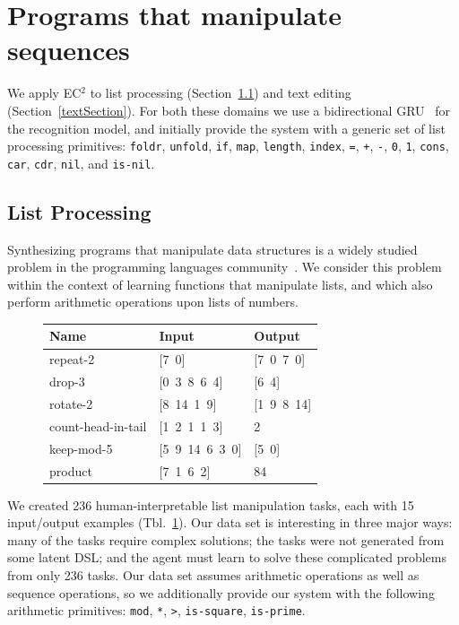 \documentclass{article}
\newcommand{\system}{\textsc{EC$^2$} }
\newcommand{\code}[1]{{\footnotesize\texttt{#1}}}
\begin{document}
\pagebreak
\section{Programs that manipulate sequences}\label{sequences}
We apply \system to list processing (Section~\ref{listSection}) and text editing (Section~\ref{textSection}).
For both these domains we use a bidirectional GRU~\cite{cho2014learning} for
the recognition model, and initially provide the system with a generic set
of list processing primitives:
\code{foldr}, \code{unfold}, \code{if}, \code{map}, \code{length},
\code{index}, \code{=}, \code{+}, \code{-}, \code{0}, \code{1}, \code{cons},
\code{car}, \code{cdr}, \code{nil}, and \code{is-nil}.

\vspace{0.5cm}

\subsection{List Processing}\label{listSection}
Synthesizing programs that manipulate data structures is a widely studied
problem in the programming languages community~\cite{feser2015synthesizing}.
We consider this problem within the context of learning functions that
manipulate lists, and which also perform arithmetic operations upon lists of numbers.


\begin{figure}\centering
  \begin{tabular}{lll}
    \toprule
    Name & Input & Output \\\midrule
    repeat-2 & [7\, 0] & [7\, 0\, 7\, 0] \\
    drop-3 & [0\, 3\, 8\, 6\, 4] & [6\, 4] \\
    rotate-2 & [8\, 14\, 1\, 9] & [1\, 9\, 8\, 14] \\
    count-head-in-tail & [1\, 2\, 1\, 1\, 3] & 2 \\
    keep-mod-5 & [5\, 9\, 14\, 6\, 3\, 0] & [5\, 0] \\
    product & [7\, 1\, 6\, 2] & 84 \\
    \bottomrule
  \end{tabular}
  \label{listexamples}
\end{figure}
We created 236 human-interpretable list manipulation tasks, each with 15
input/output examples (Tbl.~\ref{listexamples}).
Our data set is interesting in three major ways: many of the tasks require
complex solutions; the tasks were not generated from some latent DSL; and
the agent must learn to solve these complicated problems from only 236
tasks.
Our data set assumes arithmetic operations as well as sequence operations,
so we additionally provide our system with the following arithmetic
primitives: \code{mod}, \code{*}, \code{>}, \code{is-square},
\code{is-prime}.
\end{document}
